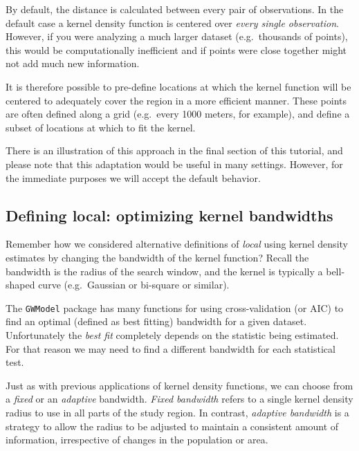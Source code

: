 \documentclass[
]{book}
\newenvironment{rmdtip}[1]
  {
  \begin{itemize}
  \renewcommand{\labelitemi}{
    \raisebox{-.7\height}[0pt][0pt]{
      {\setkeys{Gin}{width=3em,keepaspectratio}\texttt{[image: images/\#1]}}
    }
  }
  \setlength{\fboxsep}{1em}
  \begin{tip}
  \item
  }
  {
  \end{tip}
  \end{itemize}
  }
\begin{document}
\begin{rmdtip}{tip}
By default, the distance is calculated between every pair of observations. In the default case a kernel density function is centered over \emph{every single observation}. However, if you were analyzing a much larger dataset (e.g.~thousands of points), this would be computationally inefficient and if points were close together might not add much new information.

It is therefore possible to pre-define locations at which the kernel function will be centered to adequately cover the region in a more efficient manner. These points are often defined along a grid (e.g.~every 1000 meters, for example), and define a subset of locations at which to fit the kernel.

There is an illustration of this approach in the final section of this tutorial, and please note that this adaptation would be useful in many settings. However, for the immediate purposes we will accept the default behavior.

\end{rmdtip}

\hypertarget{defining-local-optimizing-kernel-bandwidths}{%
\subsection{Defining local: optimizing kernel bandwidths}\label{defining-local-optimizing-kernel-bandwidths}}

Remember how we considered alternative definitions of \emph{local} using kernel density estimates by changing the bandwidth of the kernel function? Recall the bandwidth is the radius of the search window, and the kernel is typically a bell-shaped curve (e.g.~Gaussian or bi-square or similar).

The \texttt{GWModel} package has many functions for using cross-validation (or AIC) to find an optimal (defined as best fitting) bandwidth for a given dataset. Unfortunately the \emph{best fit} completely depends on the statistic being estimated. For that reason we may need to find a different bandwidth for each statistical test.

Just as with previous applications of kernel density functions, we can choose from a \emph{fixed} or an \emph{adaptive} bandwidth. \emph{Fixed bandwidth} refers to a single kernel density radius to use in all parts of the study region. In contrast, \emph{adaptive bandwidth} is a strategy to allow the radius to be adjusted to maintain a consistent amount of information, irrespective of changes in the population or area.
\end{document}
